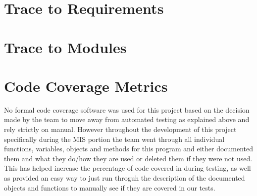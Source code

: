 \documentclass[12pt, titlepage]{article}
\begin{document}
\section{Trace to Requirements}
\section{Trace to Modules}
\section{Code Coverage Metrics}
No formal code coverage software was used for this project based on the decision made by the team to move away from automated testing as explained above and rely strictly on manual. However throughout the development of this project specifically during the MIS portion the team went through all individual functions, variables, objects and methods for this program and either documented them and what they do/how they are used or deleted them if they were not used. This has helped increase the percentage of code covered in during testing, as well as provided an easy way to just run throguh the description of the documented objects and functions to manually see if they are covered in our tests.





\end{document}
